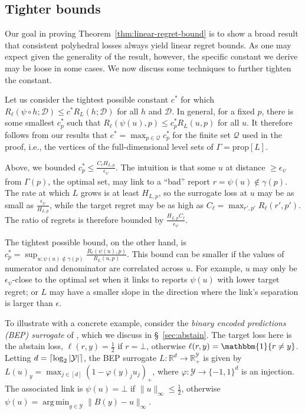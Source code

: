 \documentclass[11pt]{article}
\newcommand{\reals}{\mathbb{R}}
\newcommand{\prop}[1]{\mathrm{prop}[#1]}
\newcommand{\D}{\mathcal{D}}
\newcommand{\Y}{\mathcal{Y}}
\newcommand{\ones}{\mathbbm{1}}
\DeclarePairedDelimiter\ceil{\lceil}{\rceil}
\DeclareMathOperator*{\argmin}{arg\,min}
\begin{document}
\subsection{Tighter bounds}
\label{sec:regret-tighter-bounds}

Our goal in proving Theorem~\ref{thm:linear-regret-bound} is to show a broad result that consistent polyhedral losses always yield linear regret bounds.
As one may expect given the generality of the result, however, the specific constant we derive may be loose in some cases.
We now discuss some techniques to further tighten the constant.

Let us consider the tightest possible constant $c^*$ for which $R_{\ell}(\psi \circ h;\D) \leq c^* R_L(h;\D)$ for all $h$ and $\D$.
In general, for a fixed $p$, there is some smallest $c_p^*$ such that $R_{\ell}(\psi(u),p) \leq c_p^* R_L(u,p)$ for all $u$.
It therefore follows from our results that $c^* = \max_{p \in \mathcal{Q}} c_p^*$ for the finite set $\mathcal{Q}$ used in the proof, i.e., the vertices of the full-dimensional level sets of $\Gamma = \prop{L}$.

Above, we bounded $c_p^* \leq \frac{C_{\ell} H_{L,p}}{\epsilon_{\psi}}$.
The intuition is that some $u$ at distance $\geq \epsilon_{\psi}$ from $\Gamma(p)$, the optimal set, may link to a ``bad'' report $r = \psi(u) \not\in \gamma(p)$.
The rate at which $L$ grows is at least $H_{L,p}$, so the surrogate loss at $u$ may be as small as $\frac{\epsilon_{\psi}}{H_{L,p}}$, while the target regret may be as high as $C_{\ell} = \max_{r',p'} R_{\ell}(r',p')$.
The ratio of regrets is therefore bounded by $\frac{H_{L,p} C_{\ell}}{\epsilon_{\psi}}$.

The tightest possible bound, on the other hand, is $c_p^* = \sup_{u: \psi(u) \not\in \gamma(p)} \frac{R_{\ell}(\psi(u),p)}{R_L(u,p)}$.
This bound can be smaller if the values of numerator and denominator are correlated across $u$.
For example, $u$ may only be $\epsilon_{\psi}$-close to the optimal set when it links to reports $\psi(u)$ with lower target regret; or $L$ may have a smaller slope in the direction where the link's separation is larger than $\epsilon$.

To illustrate with a concrete example, consider the \emph{binary encoded predictions (BEP) surrogate} of \citet{ramaswamy2018consistent}, which we discuss in \S~\ref{sec:abstain}.
The target loss here is the abstain loss, $\ell(r,y) = \frac{1}{2}$ if $r = \bot$, otherwise $\ell(r,y) = \ones\{r \neq y\}$.
Letting $d = \ceil{\log_2 |\Y|}$, the BEP surrogate $L : \reals^d \to \reals^\Y_+$ is given by
$L(u)_y = \max_{j \in [d]} \left(1 - \varphi(y)_j u_j\right)_+$,
where $\varphi:\Y\to\{-1,1\}^d$ is an injection.
The associated link is $\psi(u) = \bot$ if $\|u\|_\infty \leq \tfrac{1}{2}$, otherwise $\psi(u) = \argmin_{y \in \Y} \|B(y) - u\|_{\infty}$.
\end{document}

